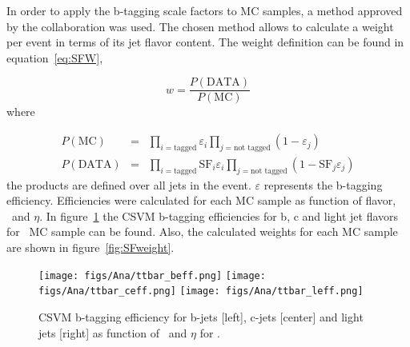 In order to apply the b-tagging scale factors to MC samples, a method approved by the collaboration was used. The chosen method allows to calculate a weight per event in terms of its jet flavor content. The weight definition can be found in equation~\ref{eq:SFW}, 

\begin{equation}
  \label{eq:SFW}
  w=\frac{P(\text{DATA})}{P(\text{MC})}
\end{equation}where

\begin{eqnarray}
  \label{eq:DataMCSFP}
  P(\text{MC}) & = & \prod_{i=\text{tagged}} \varepsilon_i \prod_{j=\text{not tagged}} (1-\varepsilon_j) \\
  P(\text{DATA}) & = & \prod_{i=\text{tagged}} \text{SF}_i \varepsilon_i \prod_{j=\text{not tagged}} (1-\text{SF}_j \varepsilon_j)
\end{eqnarray}the products are defined over all jets in the event. $\varepsilon$ represents the b-tagging efficiency. Efficiencies were calculated for each MC sample as function of flavor, \pt~and $\eta$. In figure~\ref{fig:ttbarBEff} the CSVM b-tagging efficiencies for b, c and light jet flavors for \ttbar~MC sample can be found. Also, the calculated weights for each MC sample are shown in figure~\ref{fig:SFweight}. 


\begin{figure}[!Hhtbp]
  \begin{center}
    \texttt{[image: figs/Ana/ttbar\_beff.png]}
    \texttt{[image: figs/Ana/ttbar\_ceff.png]}
    \texttt{[image: figs/Ana/ttbar\_leff.png]}
    \caption{CSVM b-tagging efficiency for b-jets [left], c-jets [center] and light jets [right] as function of \pt~and $\eta$ for \ttbar.}
    \label{fig:ttbarBEff}
  \end{center}
\end{figure}

